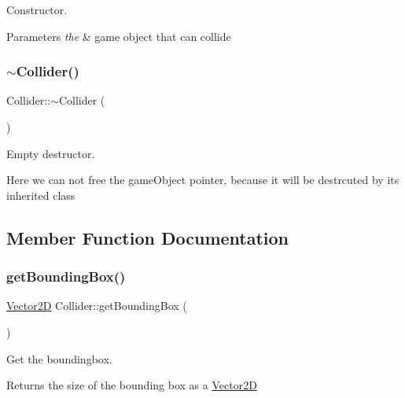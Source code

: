 Constructor. 


\begin{DoxyParams}{Parameters}
{\em the} & game object that can collide \\
\hline
\end{DoxyParams}
\mbox{\label{class_collider_a564acde9860f875a32a6638c573d87be}} 
\subsubsection{\texorpdfstring{$\sim$\+Collider()}{~Collider()}}
{\footnotesize\ttfamily Collider\+::$\sim$\+Collider (\begin{DoxyParamCaption}{ }\end{DoxyParamCaption})}



Empty destructor. 

Here we can not free the game\+Object pointer, because it will be destrcuted by its inherited class 

\subsection{Member Function Documentation}
\mbox{\label{class_collider_a1568326683a3d1de3aedeaa22a36bdde}} 
\subsubsection{\texorpdfstring{get\+Bounding\+Box()}{getBoundingBox()}}
{\footnotesize\ttfamily \mbox{\hyperlink{struct_vector2_d}{Vector2D}} Collider\+::get\+Bounding\+Box (\begin{DoxyParamCaption}{ }\end{DoxyParamCaption})}



Get the boundingbox. 

\begin{DoxyReturn}{Returns}
the size of the bounding box as a \mbox{\hyperlink{struct_vector2_d}{Vector2D}} 
\end{DoxyReturn}
\mbox{\label{class_collider_af02a08d0a8ee0727d7e71b22bafc762f}} 
